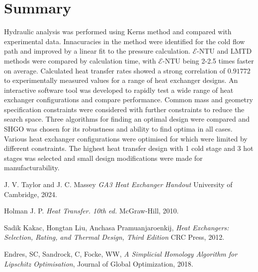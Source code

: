 \documentclass{article}
\begin{document}
\section{Summary}

Hydraulic analysis was performed using Kerns method and compared with experimental data.
Innacuracies in the method were identified for the cold flow path and improved by a linear fit to the pressure calculation.
$\mathcal{E}$-NTU and LMTD methods were compared by calculation time, with $\mathcal{E}$-NTU being 2-2.5 times faster on average.
Calculated heat transfer rates showed a strong correlation of $\mathbf{0.91772}$ to experimentally measured values for a range of heat exchanger designs.
An interactive software tool was developed to rapidly test a wide range of heat exchanger configurations and compare performance.
Common mass and geometry specification constraints were considered with further constraints to reduce the search space.
Three algorithms for finding an optimal design were compared and SHGO was chosen for its robustness and ability to find optima in all cases.
Various heat exchanger configurations were optimised for which were limited by different constraints.
The highest heat transfer design with 1 cold stage and 3 hot stages was selected and small design modifications were made for manufacturability.


\begin{thebibliography}{9}


  J. V. Taylor and J. C. Massey
  \emph{GA3 Heat Exchanger Handout}
  University of Cambridge,
  2024.

  Holman J. P.
  \emph{Heat Transfer. 10th ed.}
  McGraw-Hill,
  2010.

  Sadik Kakac, Hongtan Liu, Anchasa Pramuanjaroenkij,
  \emph{Heat Exchangers: Selection, Rating, and Thermal Design, Third Edition}
  CRC Press,
  2012.

  Endres, SC, Sandrock, C, Focke, WW,
  \emph{A Simplicial Homology Algorithm for Lipschitz Optimisation},
  Journal of Global Optimization,
  2018.

\end{thebibliography}
\end{document}
